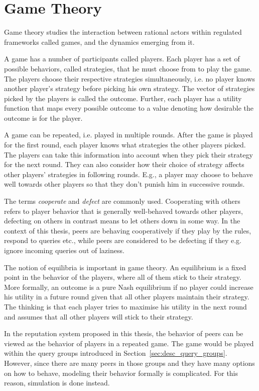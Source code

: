 \section{Game Theory}
Game theory studies the interaction between rational actors within regulated
frameworks called games, and the dynamics emerging from it.

A game has a number of participants called players. Each player has a set of
possible behaviors, called strategies, that he must choose from to play the
game. The players choose their respective strategies simultaneously, i.e. no
player knows another player's strategy before picking his own strategy. The
vector of strategies picked by the players is called the outcome. Further, each
player has a utility function that maps every possible outcome to a value
denoting how desirable the outcome is for the player.

A game can be repeated, i.e. played in multiple rounds. After the game is played
for the first round, each player knows what strategies the other players picked.
The players can take this information into account when they pick their strategy
for the next round. They can also consider how their choice of strategy affects
other players' strategies in following rounds. E.g., a player may choose to
behave well towards other players so that they don't punish him in successive
rounds.

The terms \emph{cooperate} and \emph{defect} are commonly used. Cooperating with
others refers to player behavior that is generally well-behaved towards other
players, defecting on others in contrast means to let others down in some way.
In the context of this thesis, peers are behaving cooperatively if they play by
the rules, respond to queries etc., while peers are considered to be defecting
if they e.g. ignore incoming queries out of laziness.

The notion of equilibria is important in game theory. An equilibrium is a fixed
point in the behavior of the players, where all of them stick to their strategy.
More formally, an outcome is a pure Nash equilibrium if no player could increase
his utility in a future round given that all other players maintain their
strategy. The thinking is that each player tries to maximise his utility in the
next round and assumes that all other players will stick to their strategy.

In the reputation system proposed in this thesis, the behavior of peers can be
viewed as the behavior of players in a repeated game. The game would be played
within the query groups introduced in Section~\ref{sec:desc_query_groups}.
However, since there are many peers in those groups and they have many options
on how to behave, modeling their behavior formally is complicated. For this
reason, simulation is done instead.
